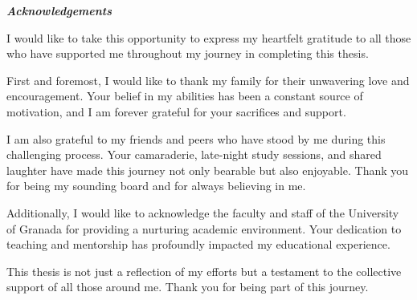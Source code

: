 \clearpage
\thispagestyle{empty}
\mbox{}
\newpage

\thispagestyle{empty}

\begin{center}
    \large\bfseries \textit{Acknowledgements}
\end{center}

I would like to take this opportunity to express my heartfelt gratitude to all those who have supported me throughout my journey in completing this thesis.

\textgap

First and foremost, I would like to thank my family for their unwavering love and encouragement. Your belief in my abilities has been a constant source of motivation, and I am forever grateful for your sacrifices and support.

\textgap

I am also grateful to my friends and peers who have stood by me during this challenging process. Your camaraderie, late-night study sessions, and shared laughter have made this journey not only bearable but also enjoyable. Thank you for being my sounding board and for always believing in me.

\textgap

Additionally, I would like to acknowledge the faculty and staff of the University of Granada for providing a nurturing academic environment. Your dedication to teaching and mentorship has profoundly impacted my educational experience.

\textgap

This thesis is not just a reflection of my efforts but a testament to the collective support of all those around me. Thank you for being part of this journey.

\clearpage
\thispagestyle{empty}
\mbox{}
\newpage
